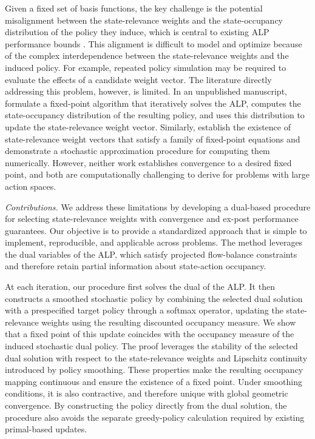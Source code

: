 \documentclass[sglanonrev]{informs4}
\def\edits#1{{\color{black}#1}}
\begin{document}
Given a fixed set of basis functions, the key challenge is the potential misalignment between the state-relevance weights and the state-occupancy distribution of the policy they induce, which is central to existing \ac{ALP} performance bounds \citep{de2003linear, de2008choosing}. This alignment is difficult to model and optimize because of the complex interdependence between the state-relevance weights and the induced policy. For example, repeated policy simulation may be required to evaluate the effects of a candidate weight vector. The literature directly addressing this problem, however, is limited. In an unpublished manuscript, \citet{le2004choose} formulate a fixed-point algorithm that iteratively solves the \ac{ALP}, computes the state-occupancy distribution of the resulting policy, and uses this distribution to update the state-relevance weight vector. \edits{Similarly, \citet{de2008choosing} establish the existence of state-relevance weight vectors that satisfy a family of fixed-point equations and demonstrate a stochastic approximation procedure for computing them numerically. However, neither work establishes convergence to a desired fixed point, and both are computationally challenging to derive for problems with large action spaces.}

\smallskip
\noindent 
\textit{Contributions.} We address these limitations by developing a dual-based procedure for selecting state-relevance weights with convergence and ex-post performance guarantees. \edits{Our objective is to provide a standardized approach that is simple to implement, reproducible, and applicable across problems. The method leverages the dual variables of the \ac{ALP}, which satisfy projected flow-balance constraints and therefore retain partial information about state-action occupancy.}

\edits{At each iteration, our procedure first solves the dual of the ALP. It then constructs a smoothed stochastic policy by combining the selected dual solution with a prespecified target policy through a softmax operator, updating the state-relevance weights using the resulting discounted occupancy measure. We show that a fixed point of this update coincides with the occupancy measure of the induced stochastic dual policy.} The proof leverages the stability of the selected dual solution with respect to the state-relevance weights and Lipschitz continuity introduced by policy smoothing. These properties make the resulting occupancy mapping continuous and ensure the existence of a fixed point. Under smoothing conditions, it is also contractive, and therefore unique with global geometric convergence. By constructing the policy directly from the dual solution, the procedure also avoids the separate greedy-policy calculation required by existing primal-based updates.
\end{document}
